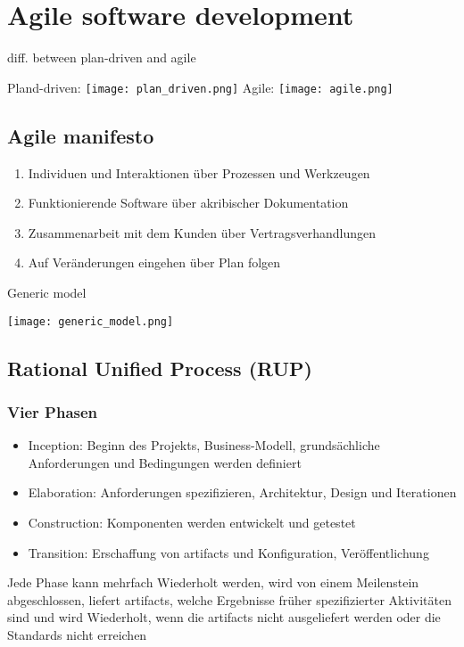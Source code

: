 \section{Agile software development}
\begin{table}[H]
\caption{diff. between plan-driven and agile}
Pland-driven: \newline
\texttt{[image: plan\_driven.png]}
Agile: \newline
\texttt{[image: agile.png]}
\end{table}
\subsection{Agile manifesto}
\begin{enumerate}
	\item Individuen und Interaktionen über Prozessen und Werkzeugen
	\item Funktionierende Software über akribischer Dokumentation
	\item Zusammenarbeit mit dem Kunden über Vertragsverhandlungen
	\item Auf Veränderungen eingehen über Plan folgen
\end{enumerate}
\begin{table}[H]
\caption{Generic model}
\texttt{[image: generic\_model.png]}
\end{table}
\subsection{Rational Unified Process (RUP)}
\subsubsection{Vier Phasen}
\begin{itemize}
	\item Inception: Beginn des Projekts, Business-Modell, grundsächliche Anforderungen und Bedingungen werden definiert
	\item Elaboration: Anforderungen spezifizieren, Architektur, Design und Iterationen 
	\item Construction: Komponenten werden entwickelt und getestet
	\item Transition: Erschaffung von \glqq{}artifacts\grqq{} und Konfiguration, Veröffentlichung 
\end{itemize}
Jede Phase kann mehrfach Wiederholt werden, wird von einem Meilenstein abgeschlossen, liefert \glqq{}artifacts\grqq{}, welche Ergebnisse früher spezifizierter Aktivitäten sind und wird Wiederholt, wenn die \glqq{}artifacts\grqq{}  nicht ausgeliefert werden oder die Standards nicht erreichen \newline \newline

